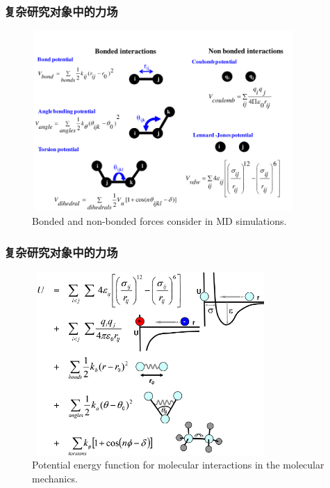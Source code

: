 \frame
{
	\frametitle{复杂研究对象中的力场}
\begin{figure}[h!]
\centering
\vspace*{-0.10in}
\includegraphics[height=2.70in,width=3.95in,viewport=0 0 830 550,clip]{Figures/Bonded-and-non-bonded-interactions-used-to-describe-interactions-between-atoms.png}
\caption{\tiny \textrm{Bonded and non-bonded forces consider in MD simulations.}}%
\label{Bond-non-Bonded}
\end{figure}
}

\frame
{
	\frametitle{复杂研究对象中的力场}
\begin{figure}[h!]
\centering
\vspace*{-0.15in}
\includegraphics[height=2.75in,width=3.55in,viewport=0 0 660 540,clip]{Figures/Potential-energy-function-for-molecular-interactions-in-the-molecular-mechanics.png}
\caption{\tiny \textrm{Potential energy function for molecular interactions in the molecular mechanics.}}%
\label{Potential-component}
\end{figure}
}

